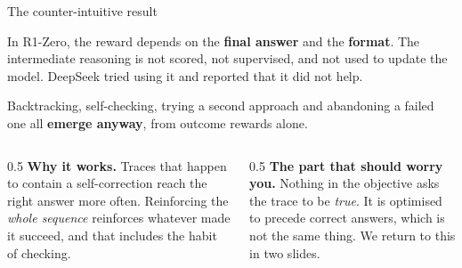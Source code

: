 \documentclass[aspectratio=169,10pt]{beamer}
\begin{document}
\begin{frame}{The counter-intuitive result}
  \begin{gotcha}
    In R1-Zero, the reward depends on the \textbf{final answer} and the
    \textbf{format}. The intermediate reasoning is not scored, not supervised,
    and not used to update the model. DeepSeek tried using it and reported that
    it did not help.
    \vspace{0.3em}

    Backtracking, self-checking, trying a second approach and abandoning a
    failed one all \textbf{emerge anyway}, from outcome rewards alone.
  \end{gotcha}
  \vspace{0.5em}
  \begin{columns}[T]
    \begin{column}{0.5\textwidth}
      \small
      \textbf{Why it works.} Traces that happen to contain a self-correction
      reach the right answer more often. Reinforcing the \emph{whole sequence}
      reinforces whatever made it succeed, and that includes the habit of
      checking.
    \end{column}
    \begin{column}{0.5\textwidth}
      \small
      \textbf{The part that should worry you.} Nothing in the objective asks
      the trace to be \emph{true}. It is optimised to precede correct answers,
      which is not the same thing. We return to this in two slides.
    \end{column}
  \end{columns}
\end{frame}
\end{document}
